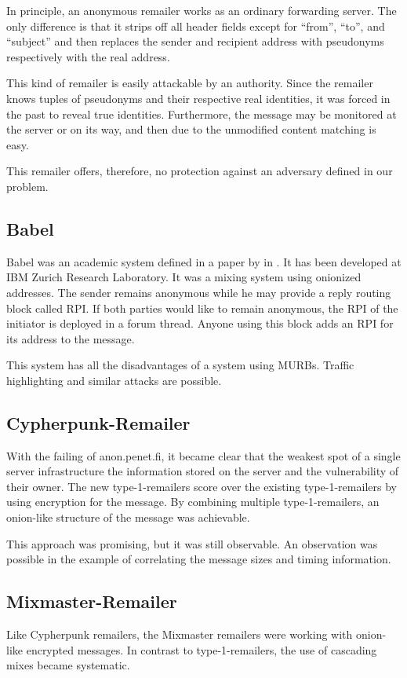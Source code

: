 In principle, an anonymous remailer works as an ordinary forwarding  server. The only difference is that it strips off all header fields except for ``from'', ``to'', and ``subject'' and then replaces the sender and recipient address with pseudonyms respectively with the real address. 

This kind of remailer is easily attackable by an authority. Since the remailer knows tuples of pseudonyms and their respective real identities, it was forced in the past to reveal true identities\cite{penetClosure}. Furthermore, the message may be monitored at the server or on its way, and then due to the unmodified content matching is easy.

This remailer offers, therefore, no protection against an adversary defined in our problem.

\subsection{Babel}
Babel was an academic system defined in a paper by \citeauthor{babel} in \citeyear{babel}\cite{babel}. It has been developed at IBM Zurich Research Laboratory. It was a mixing system using onionized addresses. The sender remains anonymous while he may provide a reply routing block called RPI. If both parties would like to remain anonymous, the RPI of the initiator is deployed in a forum thread. Anyone using this block adds an RPI for its address to the message.

This system has all the disadvantages of a system using MURBs. Traffic highlighting and similar attacks are possible.

\subsection{Cypherpunk-Remailer\label{sec:remCypherpunk}}
With the failing of anon.penet.fi, it became clear that the weakest spot of a single server infrastructure the information stored on the server and the vulnerability of their owner. The new type-1-remailers score over the existing type-1-remailers by using encryption for the message. By combining multiple type-1-remailers, an onion-like structure of the message was achievable. 

This approach was promising, but it was still observable. An observation was possible in the example of correlating the message sizes and timing information.

\subsection{Mixmaster-Remailer\label{sec:remMixmaster}}
Like Cypherpunk remailers, the Mixmaster remailers were working with onion-like encrypted messages. In contrast to type-1-remailers, the use of cascading mixes became systematic.

